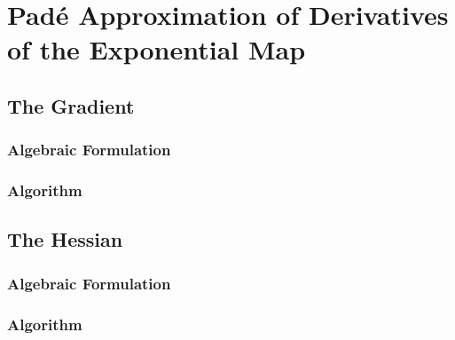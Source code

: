 \chapter{Pad\'{e} Approximation of Derivatives of the Exponential Map}
\section{The Gradient}
\subsection{Algebraic Formulation}
\subsection{Algorithm}
\section{The Hessian}
\subsection{Algebraic Formulation}

\subsection{Algorithm}